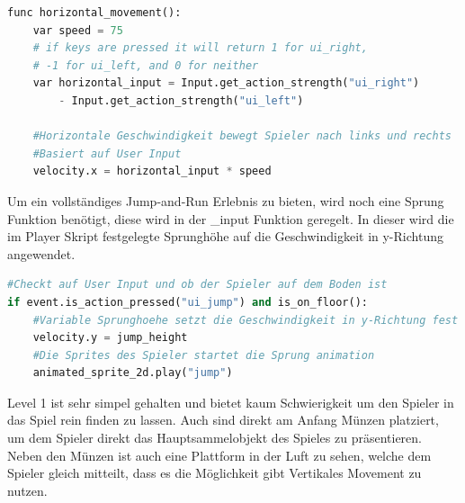 \documentclass{article}
\begin{document}
 \begin{table}[h]
 	\begin{tcolorbox}[colframe=Black, sharp corners, boxrule=0.5mm, colback=white]
 		
 		\vspace{-5mm}
 		
 \begin{lstlisting}[language=Python]
func horizontal_movement():
	var speed = 75
	# if keys are pressed it will return 1 for ui_right,
	# -1 for ui_left, and 0 for neither
	var horizontal_input = Input.get_action_strength("ui_right") 
		- Input.get_action_strength("ui_left")
	
	#Horizontale Geschwindigkeit bewegt Spieler nach links und rechts
	#Basiert auf User Input
	velocity.x = horizontal_input * speed
 \end{lstlisting}
 	\end{tcolorbox}
 	\vspace{-5mm}
 	
 	\tiny{\caption {Funktion Horizontales Movement}}
 	\label{Player horizontal_movement()}
 \end{table}

Um ein vollständiges Jump-and-Run Erlebnis zu bieten, wird noch eine Sprung Funktion benötigt, diese wird in der \_input Funktion geregelt. In dieser wird die im Player Skript festgelegte Sprunghöhe auf die Geschwindigkeit in y-Richtung angewendet.

\begin{table}[h]
	\begin{tcolorbox}[colframe=Black, sharp corners, boxrule=0.5mm, colback=white]
		
		\vspace{-5mm}
		
\begin{lstlisting}[language=Python]
#Checkt auf User Input und ob der Spieler auf dem Boden ist
if event.is_action_pressed("ui_jump") and is_on_floor():
	#Variable Sprunghoehe setzt die Geschwindigkeit in y-Richtung fest
	velocity.y = jump_height
	#Die Sprites des Spieler startet die Sprung animation
	animated_sprite_2d.play("jump")
\end{lstlisting}
	\end{tcolorbox}
	\vspace{-5mm}
	
	\tiny{\caption {Funktionsabschnitt Sprung}}
	\label{Player jump}
\end{table}

Level 1 ist sehr simpel gehalten und bietet kaum Schwierigkeit um den Spieler in das Spiel rein finden zu lassen. Auch sind direkt am Anfang Münzen platziert, um dem Spieler direkt das Hauptsammelobjekt des Spieles zu präsentieren. Neben den Münzen ist auch eine Plattform in der Luft zu sehen, welche dem Spieler gleich mitteilt, dass es die Möglichkeit gibt Vertikales Movement zu nutzen. 
\end{document}
